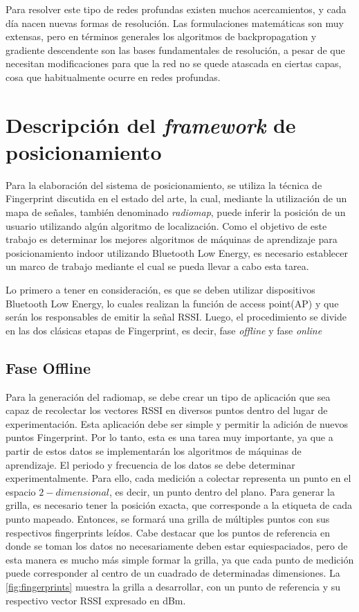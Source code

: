 Para resolver este tipo de redes profundas existen muchos acercamientos, y cada día nacen nuevas formas de resolución. Las formulaciones matemáticas son muy extensas, pero en términos generales los algoritmos de backpropagation y gradiente descendente son las bases fundamentales de resolución, a pesar de que necesitan modificaciones para que la red no se quede atascada en ciertas capas, cosa que habitualmente ocurre en redes profundas.


\section{Descripción del \textit{framework} de posicionamiento}

Para la elaboración del sistema de posicionamiento, se utiliza la técnica de Fingerprint discutida en el estado del arte, la cual, mediante la utilización de un mapa de señales, también denominado \textit{radiomap}, puede inferir la posición de un usuario utilizando algún algoritmo de localización. Como el objetivo de este trabajo es determinar los mejores algoritmos de máquinas de aprendizaje para posicionamiento indoor utilizando Bluetooth Low Energy, es necesario establecer un marco de trabajo mediante el cual se pueda llevar a cabo esta tarea.

Lo primero a tener en consideración, es que se deben utilizar dispositivos Bluetooth Low Energy, lo cuales realizan la función de access point(AP) y que serán los responsables de emitir la señal RSSI. Luego, el procedimiento se divide en las dos clásicas etapas de Fingerprint, es decir, fase \textit{offline} y fase \textit{online}

\subsection{Fase Offline}

Para la generación del radiomap, se debe crear un tipo de aplicación que sea capaz de recolectar los vectores RSSI en diversos puntos dentro del lugar de experimentación. Esta aplicación debe ser simple y permitir la adición de nuevos puntos Fingerprint. Por lo tanto, esta es una tarea muy importante, ya que a partir de estos datos se implementarán los algoritmos de máquinas de aprendizaje. El periodo y frecuencia de los datos se debe determinar experimentalmente. Para ello, cada medición a colectar representa un punto en el espacio $2-dimensional$, es decir, un punto dentro del plano. Para generar la grilla, es necesario tener la posición exacta, que corresponde a la etiqueta de cada punto mapeado. Entonces, se formará una grilla de múltiples puntos con sus respectivos fingerprints leídos. Cabe destacar que los puntos de referencia en donde se toman los datos no necesariamente deben estar equiespaciados, pero de esta manera es mucho más simple formar la grilla, ya que cada punto de medición puede corresponder al centro de un cuadrado de determinadas dimensiones. La \autoref{fig:fingerprints} muestra la grilla a desarrollar, con un punto de referencia y su respectivo vector RSSI expresado en dBm.

